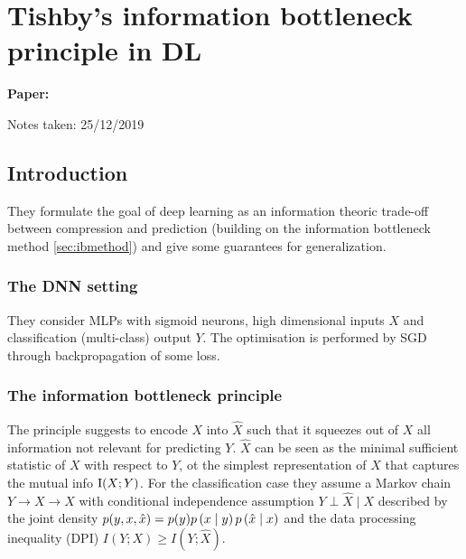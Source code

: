 \providecommand{\hx}{}
\renewcommand{\hx}{\hat{x}}
\providecommand{\hX}{}
\renewcommand{\hX}{\hat{X}}

\clearpage

\section{Tishby's information bottleneck principle in DL}\label{sec:ibdnn}

\begin{notebox}
\textbf{Paper: } 

\hfill Notes taken: 25/12/2019 
\end{notebox}


\subsection{Introduction}

They formulate the goal of deep learning as an information theoric trade-off between compression and prediction (building on the information bottleneck method \ref{sec:ibmethod}) and give some guarantees for generalization.

\subsubsection{The DNN setting}
They consider MLPs with sigmoid neurons, high dimensional inputs $X$ and classification (multi-class) output $Y$.
The optimisation is performed by SGD through backpropagation of some loss.

\subsubsection{The information bottleneck principle}

The principle suggests to encode $X$ into $\hX$ such that it squeezes out of $X$ all information not relevant for predicting $Y$.
$\hX$ can be seen as the minimal sufficient statistic of $X$ with respect to $Y$, ot the simplest representation of $X$ that captures the mutual info $\mathrm{I}(X; Y)$.
For the classification case they assume a Markov chain $Y \to X \to \hX$ with conditional independence assumption $Y \perp \hX \mid X$ described by the joint density $p(y, x, \hx) = p(y) \pc{x}{y} \pc{\hx}{x} $ and the data processing inequality (DPI) $I(Y; X) \geq I(Y; \hX)$.

